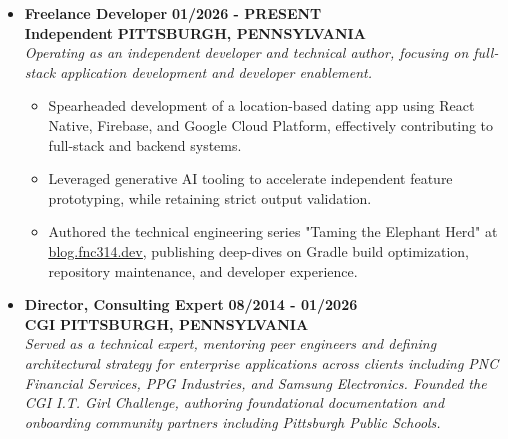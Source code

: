 \documentclass[10pt,letterpaper]{article}
\newcommand{\myhref}[2]{\href{#1}{\uline{#2}}}
\renewcommand{\section}[1]{%
  \par\vspace{8pt}%
  \noindent\colorbox{color1}{%
    \makebox[\dimexpr\textwidth-2\fboxsep\relax][c]{%
      \textcolor{white}{\ttfamily\bfseries\large\strut \MakeUppercase{#1}}%
    }%
  }%
  \par\vspace{4pt}%
}
\begin{document}
\section{PROFESSIONAL EXPERIENCE}
\vspace{3pt}
\begin{itemize}[label={}, leftmargin=0pt, itemsep=6pt, parsep=0pt]

\item{
\textbf{\ttfamily\large Freelance Developer} \hfill \textbf{\ttfamily\large\color{color1} 01/2026 - PRESENT}\\
\textbf{\ttfamily\normalsize\color{color1} Independent} \hfill \textbf{\ttfamily\normalsize\color{color1} PITTSBURGH, PENNSYLVANIA}\vspace{2pt}\\
{\itshape\sffamily Operating as an independent developer and technical author, focusing on full-stack application development and developer enablement.}\vspace{2pt}
\begin{itemize}[label=\textbullet, leftmargin=15pt, itemsep=1pt, parsep=0pt]
    \item {\sffamily Spearheaded development of a location-based dating app using React Native, Firebase, and Google Cloud Platform, effectively contributing to full-stack and backend systems.}
    \item {\sffamily Leveraged generative AI tooling to accelerate independent feature prototyping, while retaining strict output validation.}
    \item {\sffamily Authored the technical engineering series "Taming the Elephant Herd" at \myhref{https://blog.fnc314.dev}{blog.fnc314.dev}, publishing deep-dives on Gradle build optimization, repository maintenance, and developer experience.}
\end{itemize}
}

\item{
\textbf{\ttfamily\large Director, Consulting Expert} \hfill \textbf{\ttfamily\large\color{color1} 08/2014 - 01/2026}\\
\textbf{\ttfamily\normalsize\color{color1} CGI} \hfill \textbf{\ttfamily\normalsize\color{color1} PITTSBURGH, PENNSYLVANIA}\vspace{2pt}\\
{\itshape\sffamily Served as a technical expert, mentoring peer engineers and defining architectural strategy for enterprise applications across clients including PNC Financial Services, PPG Industries, and Samsung Electronics. Founded the CGI I.T. Girl Challenge, authoring foundational documentation and onboarding community partners including Pittsburgh Public Schools.}\vspace{1pt}
}


\end{itemize}
\end{document}
